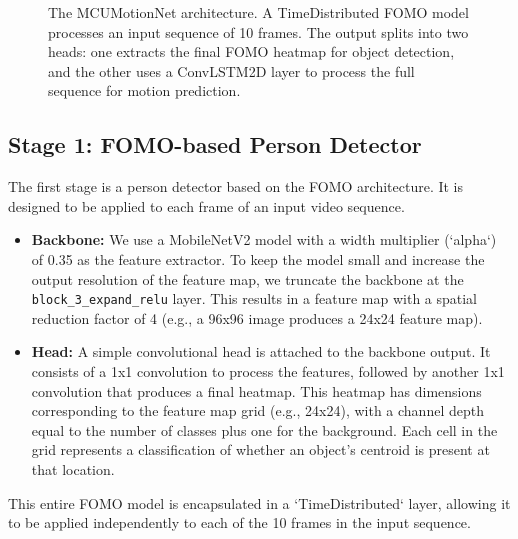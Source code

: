 \documentclass{article}
\begin{document}
\begin{figure}[h!]
{
}
\caption{The MCUMotionNet architecture. A TimeDistributed FOMO model processes an input sequence of 10 frames. The output splits into two heads: one extracts the final FOMO heatmap for object detection, and the other uses a ConvLSTM2D layer to process the full sequence for motion prediction.}
\label{fig:architecture}
\end{figure}

\subsection{Stage 1: FOMO-based Person Detector}
The first stage is a person detector based on the FOMO architecture. It is designed to be applied to each frame of an input video sequence.
\begin{itemize}
    \item \textbf{Backbone:} We use a MobileNetV2 model with a width multiplier (`alpha`) of 0.35 as the feature extractor. To keep the model small and increase the output resolution of the feature map, we truncate the backbone at the \texttt{block\_3\_expand\_relu} layer. This results in a feature map with a spatial reduction factor of 4 (e.g., a 96x96 image produces a 24x24 feature map).
    \item \textbf{Head:} A simple convolutional head is attached to the backbone output. It consists of a 1x1 convolution to process the features, followed by another 1x1 convolution that produces a final heatmap. This heatmap has dimensions corresponding to the feature map grid (e.g., 24x24), with a channel depth equal to the number of classes plus one for the background. Each cell in the grid represents a classification of whether an object's centroid is present at that location.
\end{itemize}
This entire FOMO model is encapsulated in a `TimeDistributed` layer, allowing it to be applied independently to each of the 10 frames in the input sequence.
\end{document}
